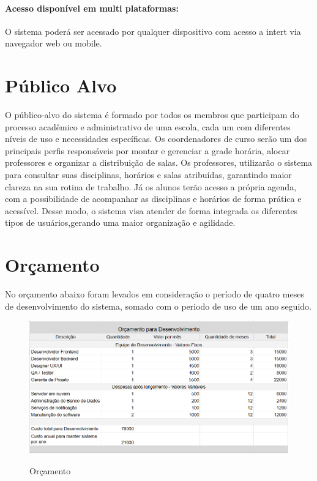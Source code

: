 \documentclass[12pt,a4paper]{report}
\begin{document}
	\paragraph{Acesso disponível em multi plataformas:} O sistema poderá ser acessado por qualquer dispositivo com acesso a intert via navegador web ou mobile.


 
\section{Público Alvo}
O público-alvo do sistema é formado por todos os membros que participam do processo acadêmico e administrativo de uma escola, cada um com diferentes níveis de uso e necessidades específicas. Os coordenadores de curso serão um dos principais perfis responsáveis por montar e gerenciar a grade horária, alocar professores e organizar a distribuição de salas. Os professores, utilizarão o sistema para consultar suas disciplinas, horários e salas atribuídas, garantindo maior clareza na sua rotina de trabalho. Já os alunos terão acesso a própria agenda, com a possibilidade de acompanhar as disciplinas e horários de forma prática e acessível. Desse modo, o sistema visa atender de forma integrada os diferentes tipos de usuários,gerando uma maior organização e agilidade.


\section{Orçamento}
No orçamento abaixo foram levados em consideração o período de quatro meses de desenvolvimento do sistema, somado com o periodo de uso de um ano seguido.
\begin{figure}[!h]
	\centering
	\includegraphics[width = \linewidth]{imagens/orcamento.png}
	\label{Orçamento}
	\caption{Orçamento}
\end{figure}
\end{document}

